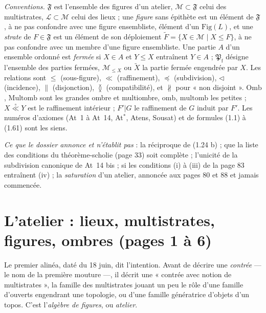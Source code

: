 \documentclass[11pt,a4paper]{article}
\begin{document}
\emph{Conventions.} $\mathfrak{F}$ est l'ensemble des figures d'un atelier,
$\mathcal{M} \subset \mathfrak{F}$ celui des multistrates, $\mathcal{L} \subset
\mathcal{M}$ celui des lieux ; une \emph{figure} sans épithète est un élément
de $\mathfrak{F}$, à ne pas confondre avec une figure ensembliste, élément d'un
$\mathrm{Fig}(L)$, et une \emph{strate} de $F \in \mathfrak{F}$ est un élément
de son déploiement $\widetilde{F} = \lbrace X \in \mathcal{M} \mid X \leq F
\rbrace$, à ne pas confondre avec un membre d'une figure ensembliste. Une partie
$A$ d'un ensemble ordonné est \emph{fermée} si $X \in A$ et $Y \leq X$
entraînent $Y \in A$ ; $\mathfrak{P}_{\mathrm{f}}$ désigne l'ensemble des
parties fermées, $\mathcal{M}_{\leq X}$ ou $\widetilde{X}$ la partie fermée
engendrée par $X$. Les relations sont $\leq$ (sous-figure), $\ll$
(raffinement), $\preccurlyeq$ (subdivision), $\triangleleft$ (incidence),
$\parallel$ (disjonction), $\between$ (compatibilité), et $\nparallel$ pour
« non disjoint ». $\mathrm{Omb}$, $\mathrm{Multomb}$ sont les grandes ombre et
multiombre, $\mathrm{omb}$, $\mathrm{multomb}$ les petites ; $X
\mathrel{\overset{\circ}{\ll}} Y$ est le raffinement intérieur ; $F'|G$ le
raffinement de $G$ induit par $F'$. Les numéros d'axiomes (At~1 à At~14, At$^{*}$,
Atens, Sousat) et de formules (1.1) à (1.61) sont les siens.

\emph{Ce que le dossier annonce et n'établit pas} : la réciproque de (1.24 b) ;
que la liste des conditions du théorème-scholie (page 33) soit complète ;
l'unicité de la subdivision canonique de At~14 bis ; si les conditions (i) à
(iii) de la page 83 entraînent (iv) ; la \emph{saturation} d'un atelier,
annoncée aux pages 80 et 88 et jamais commencée.

\section*{L'atelier : lieux, multistrates, figures, ombres (pages 1 à 6)}

Le premier alinéa, daté du 18 juin, dit l'intention. Avant de décrire une
\emph{contrée} --- le nom de la première mouture ---, il décrit une « contrée
avec notion de multistrates », la famille des multistrates jouant un peu le rôle
d'une famille d'ouverts engendrant une topologie, ou d'une famille génératrice
d'objets d'un topos. C'est l'\emph{algèbre de figures}, ou \emph{atelier}.
\end{document}
